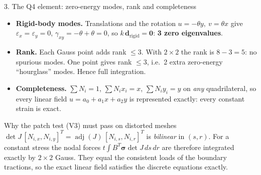\documentclass[aspectratio=169,10pt]{beamer}
\newcommand{\vd}{\mathbf d}
\begin{document}
\begin{frame}{3. The Q4 element: zero-energy modes, rank and completeness}
  \begin{itemize}
    \item \textbf{Rigid-body modes.} Translations and the rotation $u=-\theta y,\ v=\theta x$ give
          $\varepsilon_x=\varepsilon_y=0$, $\gamma_{xy}=-\theta+\theta=0$, so $k\,\vd_{\text{rigid}}=\mathbf 0$:
          \textbf{3 zero eigenvalues}.
    \item \textbf{Rank.} Each Gauss point adds rank $\le 3$. With $2\times2$ the rank is $8-3=5$: no spurious modes.
          One point gives rank $\le3$, i.e.\ 2 extra zero-energy ``hourglass'' modes. Hence full integration.
    \item \textbf{Completeness.} $\sum N_i=1$, $\sum N_ix_i=x$, $\sum N_iy_i=y$ on \emph{any} quadrilateral, so every
          linear field $u=a_0+a_1x+a_2y$ is represented exactly: every constant strain is exact.
  \end{itemize}
  \begin{block}{Why the patch test (V3) must pass on distorted meshes}
    $\det J\,[N_{i,x},N_{i,y}]^T=\operatorname{adj}(J)\,[N_{i,s},N_{i,r}]^T$ is \emph{bilinear} in $(s,r)$.
    For a constant stress the nodal forces $t\int B^T\bm\sigma\det J\,ds\,dr$ are therefore integrated exactly by
    $2\times2$ Gauss. They equal the consistent loads of the boundary tractions, so the exact linear field
    satisfies the discrete equations exactly.
  \end{block}
\end{frame}
\end{document}
